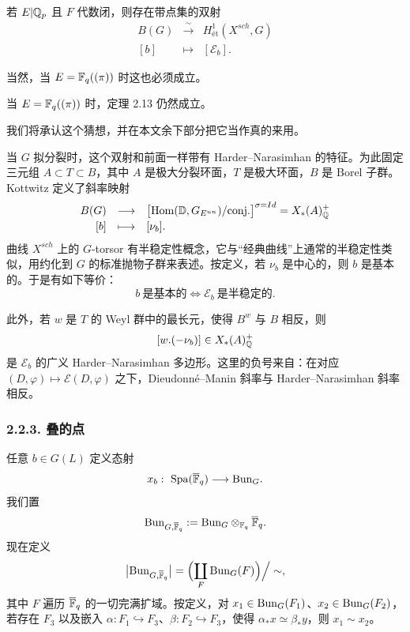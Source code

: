 \begin{theorem}\label{thm:2.13}
若 $E|\mathbb{Q}_p$ 且 $F$ 代数闭，则存在带点集的双射
\[
\begin{array}{rcl}
B(G) & \xrightarrow{\ \sim\ } & H^1_{\text{ét}}(X^{sch},G)\\[2pt]
[b] & \longmapsto & [\mathcal{E}_b].
\end{array}
\]
\end{theorem}

当然，当 $E=\mathbb{F}_q((\pi))$ 时这也必须成立。

\begin{conjecture}\label{conj:2.14}
当 $E=\mathbb{F}_q((\pi))$ 时，定理 2.13 仍然成立。
\end{conjecture}

我们将承认这个猜想，并在本文余下部分把它当作真的来用。

当 $G$ 拟分裂时，这个双射和前面一样带有 Harder–Narasimhan 的特征。为此固定三元组 $A\subset T\subset B$，其中 $A$ 是极大分裂环面，$T$ 是极大环面，$B$ 是 Borel 子群。Kottwitz 定义了斜率映射
\[
\begin{array}{rcl}
B(G) & \longrightarrow & \bigl[\operatorname{Hom}(\mathbb{D},G_{E^{un}})/\mathrm{conj.}\bigr]^{\sigma=Id}=X_*(A)^+_{\mathbb{Q}}\\[2pt]
[b] & \longmapsto & [\nu_b].
\end{array}
\]
曲线 $X^{sch}$ 上的 $G$-torsor 有半稳定性概念，它与“经典曲线”上通常的半稳定性类似，用约化到 $G$ 的标准抛物子群来表述。按定义，若 $\nu_b$ 是中心的，则 $b$ 是基本的。于是有如下等价：
\[
b\ \text{是基本的}\iff \mathcal{E}_b\ \text{是半稳定的}.
\]


此外，若 $w$ 是 $T$ 的 Weyl 群中的最长元，使得 $B^w$ 与 $B$ 相反，则
\[
[w.(-\nu_b)]\in X_*(A)^+_{\mathbb{Q}}
\]
是 $\mathcal{E}_b$ 的广义 Harder–Narasimhan 多边形。这里的负号来自：在对应 $(D,\varphi)\mapsto\mathcal{E}(D,\varphi)$ 之下，Dieudonné–Manin 斜率与 Harder–Narasimhan 斜率相反。

\subsubsection*{2.2.3. 叠的点}%

任意 $b\in G(L)$ 定义态射
\[
x_b:\ \Spa(\ol{\FF}_q)\longrightarrow \Bun_G.
\]
我们置
\[
\mathrm{Bun}_{G,\overline{\mathbb{F}}_q}:=\mathrm{Bun}_G\otimes_{\mathbb{F}_q}\overline{\mathbb{F}}_q.
\]
现在定义
\[
\bigl|\mathrm{Bun}_{G,\overline{\mathbb{F}}_q}\bigr|=\Bigl(\coprod_{F}\mathrm{Bun}_G(F)\Bigr)\Big/\sim,
\]
其中 $F$ 遍历 $\overline{\mathbb{F}}_q$ 的一切完满扩域。按定义，对 $x_1\in\mathrm{Bun}_G(F_1)$、$x_2\in\mathrm{Bun}_G(F_2)$，若存在 $F_3$ 以及嵌入 $\alpha:F_1\hookrightarrow F_3$、$\beta:F_2\hookrightarrow F_3$，使得 $\alpha_*x\simeq\beta_*y$，则 $x_1\sim x_2$。

